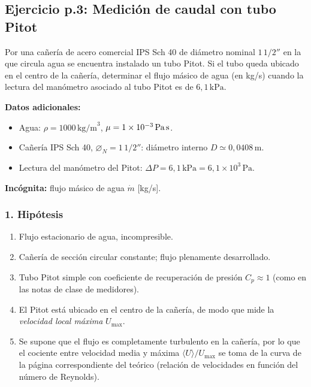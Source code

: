 \documentclass[12pt, a4paper]{article}
\begin{document}

\subsection*{Ejercicio p.3: Medición de caudal con tubo Pitot}

Por una cañería de acero comercial IPS Sch 40 de diámetro nominal
$1{\,}1/2''$ en la que circula agua se encuentra instalado un tubo Pitot.
Si el tubo queda ubicado en el centro de la cañería, determinar el flujo
másico de agua (en kg/s) cuando la lectura del manómetro asociado al
tubo Pitot es de $6{,}1\,\text{kPa}$.

\medskip

\noindent
\textbf{Datos adicionales:}
\begin{itemize}
  \item Agua: $\rho = 1000\,\text{kg/m}^3$, $\mu = 1\times 10^{-3}\,\text{Pa\,s}$.
  \item Cañería IPS Sch 40, $\varnothing_N = 1{\,}1/2''$:
        diámetro interno $D \simeq 0{,}0408\,\text{m}$.
  \item Lectura del manómetro del Pitot:
        $\Delta P = 6{,}1\,\text{kPa} = 6{,}1\times 10^3\,\text{Pa}$.
\end{itemize}

\noindent
\textbf{Incógnita:} flujo másico de agua $\dot m$ [kg/s].

\subsubsection*{1. Hipótesis}

\begin{enumerate}
  \item Flujo estacionario de agua, incompresible.
  \item Cañería de sección circular constante; flujo plenamente desarrollado.
  \item Tubo Pitot simple con coeficiente de recuperación de presión
        $C_p \approx 1$ (como en las notas de clase de medidores).
  \item El Pitot está ubicado en el centro de la cañería, de modo que mide
        la \emph{velocidad local máxima} $U_{\max}$.
  \item Se supone que el flujo es completamente turbulento en la cañería,
        por lo que el cociente entre velocidad media y máxima
        $\langle U\rangle/U_{\max}$ se toma de la curva de la página
        correspondiente del teórico (relación de velocidades en función
        del número de Reynolds).
\end{enumerate}
\end{document}
